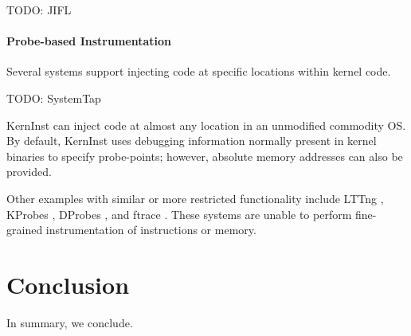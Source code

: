 \documentclass[preprint]{sigplanconf}
\begin{document}
TODO: JIFL

\paragraph{Probe-based Instrumentation} Several systems support injecting code at specific locations within kernel code.

TODO: SystemTap

KernInst \cite{KernInst} can inject code at almost any location in an unmodified commodity OS. By default, KernInst uses debugging information normally present in kernel binaries to specify probe-points; however, absolute memory addresses can also be provided.

Other examples with similar or more restricted functionality include LTTng \cite{LTTng}, KProbes \cite{KProbes}, DProbes \cite{DProbes}, and ftrace \cite{ftrace}. These systems are unable to perform fine-grained instrumentation of instructions or memory.


\section{Conclusion}\label{sec:conclusion}
In summary, we conclude.







\end{document}

